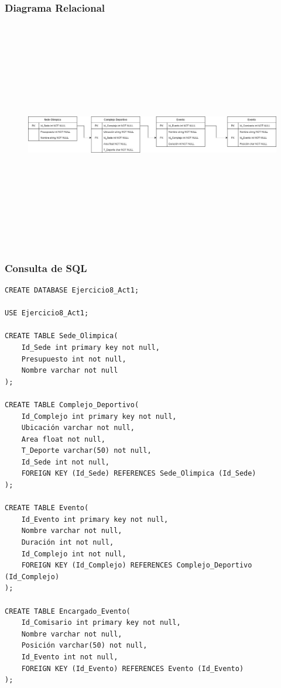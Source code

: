 \documentclass[a4paper, 12pt]{article}
\begin{document}
\begin{justify}
        \subsubsection{Diagrama Relacional}
        \begin{figure}[H]
            \centering
            \includegraphics[width=16cm,height=10cm]{rel8.jpg}
        \end{figure}
        \subsubsection{Consulta de SQL}
\begin{verbatim}
CREATE DATABASE Ejercicio8_Act1;

USE Ejercicio8_Act1;

CREATE TABLE Sede_Olimpica(
    Id_Sede int primary key not null,
    Presupuesto int not null,
    Nombre varchar not null
);

CREATE TABLE Complejo_Deportivo(
    Id_Complejo int primary key not null,
    Ubicación varchar not null,
    Area float not null,
    T_Deporte varchar(50) not null,
    Id_Sede int not null,
    FOREIGN KEY (Id_Sede) REFERENCES Sede_Olimpica (Id_Sede)
);

CREATE TABLE Evento(
    Id_Evento int primary key not null,
    Nombre varchar not null,
    Duración int not null,
    Id_Complejo int not null,
    FOREIGN KEY (Id_Complejo) REFERENCES Complejo_Deportivo (Id_Complejo)
);

CREATE TABLE Encargado_Evento(
    Id_Comisario int primary key not null,
    Nombre varchar not null,
    Posición varchar(50) not null,
    Id_Evento int not null,
    FOREIGN KEY (Id_Evento) REFERENCES Evento (Id_Evento)
);
\end{verbatim}

\end{justify}
\end{document}
